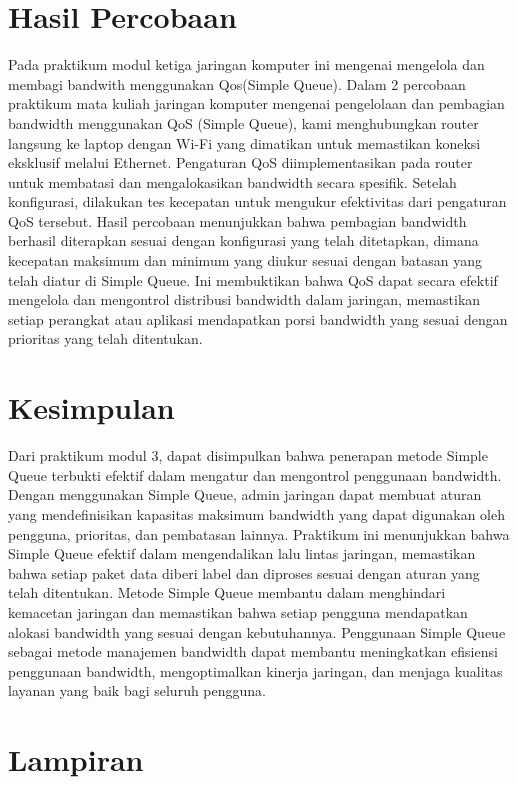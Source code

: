\section{Hasil Percobaan}
Pada praktikum modul ketiga jaringan komputer ini mengenai mengelola dan membagi bandwith menggunakan Qos(Simple Queue). Dalam 2 percobaan praktikum mata kuliah jaringan komputer mengenai pengelolaan dan pembagian bandwidth menggunakan QoS (Simple Queue), kami menghubungkan router langsung ke laptop dengan Wi-Fi yang dimatikan untuk memastikan koneksi eksklusif melalui Ethernet. Pengaturan QoS diimplementasikan pada router untuk membatasi dan mengalokasikan bandwidth secara spesifik. Setelah konfigurasi, dilakukan tes kecepatan untuk mengukur efektivitas dari pengaturan QoS tersebut. Hasil percobaan menunjukkan bahwa pembagian bandwidth berhasil diterapkan sesuai dengan konfigurasi yang telah ditetapkan, dimana kecepatan maksimum dan minimum yang diukur sesuai dengan batasan yang telah diatur di Simple Queue. Ini membuktikan bahwa QoS dapat secara efektif mengelola dan mengontrol distribusi bandwidth dalam jaringan, memastikan setiap perangkat atau aplikasi mendapatkan porsi bandwidth yang sesuai dengan prioritas yang telah ditentukan.

\section{Kesimpulan}
Dari praktikum modul 3, dapat disimpulkan bahwa penerapan metode Simple Queue terbukti efektif dalam mengatur dan mengontrol penggunaan bandwidth. Dengan menggunakan Simple Queue, admin jaringan dapat membuat aturan yang mendefinisikan kapasitas maksimum bandwidth yang dapat digunakan oleh pengguna, prioritas, dan pembatasan lainnya. 
Praktikum ini menunjukkan bahwa Simple Queue efektif dalam mengendalikan lalu lintas jaringan, memastikan bahwa setiap paket data diberi label dan diproses sesuai dengan aturan yang telah ditentukan. Metode Simple Queue membantu dalam menghindari kemacetan jaringan dan memastikan bahwa setiap pengguna mendapatkan alokasi bandwidth yang sesuai dengan kebutuhannya. Penggunaan Simple Queue sebagai metode manajemen bandwidth dapat membantu meningkatkan efisiensi penggunaan bandwidth, mengoptimalkan kinerja jaringan, dan menjaga kualitas layanan yang baik bagi seluruh pengguna.

\section{Lampiran}

